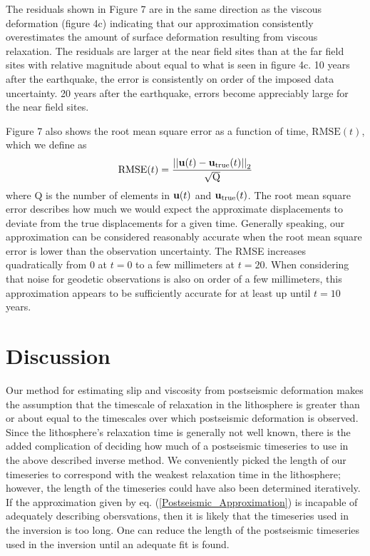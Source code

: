 \documentclass[12pt]{article}
\begin{document}
The residuals shown in Figure 7 are in the same direction
as the viscous deformation (figure 4c) indicating that our
approximation consistently overestimates the amount of surface
deformation resulting from viscous relaxation.  The residuals are
larger at the near field sites than at the far field sites with
relative magnitude about equal to what is seen in figure 4c.  10 years
after the earthquake, the error is consistently on order of the
imposed data uncertainty.  20 years after the earthquake, errors
become appreciably large for the near field sites.

Figure 7 also shows the root mean square error as
a function of time, $\mathrm{RMSE}(t)$, which we define as
\begin{equation}
  \mathrm{RMSE}(t) = \frac{\left|\left|\bold{u}(t) -
    \bold{u}_{\mathrm{true}}(t)\right|\right|_2}{\sqrt{\mathrm{Q}}}
\end{equation}
where Q is the number of elements in $\bold{u}(t)$ and
$\bold{u}_{\mathrm{true}}(t)$.  The root mean square error describes
how much we would expect the approximate displacements to deviate from
the true displacements for a given time.  Generally speaking, our
approximation can be considered reasonably accurate when the root mean square error
is lower than the observation uncertainty.  The RMSE increases
quadratically from 0 at $t=0$ to a few millimeters at $t=20$.  When
considering that noise for geodetic observations is also on order of a
few millimeters, this approximation appears to be sufficiently
accurate for at least up until $t=10$ years.


\section{Discussion}

Our method for estimating slip and viscosity from postseismic
deformation makes the assumption that the timescale of relaxation in
the lithosphere is greater than or about equal to the timescales over
which postseismic deformation is observed.  Since the lithosphere's
relaxation time is generally not well known, there is the added
complication of deciding how much of a postseismic timeseries to use
in the above described inverse method.  We conveniently picked the
length of our timeseries to correspond with the weakest relaxation
time in the lithosphere; however, the length of the timeseries could
have also been determined iteratively.  If the approximation given by
eq. (\ref{Postseismic_Approximation}) is incapable of adequately
describing obersvations, then it is likely that the timeseries used in
the inversion is too long.  One can reduce the length of the
postseismic timeseries used in the inversion until an adequate fit is
found.
\end{document}
